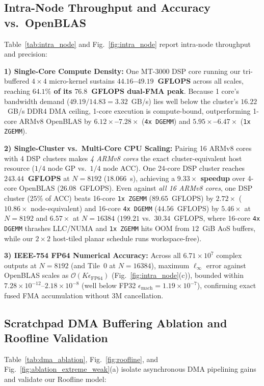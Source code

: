 \documentclass[journal]{IEEEtran}
\begin{document}
\subsection{Intra-Node Throughput and Accuracy vs.\ OpenBLAS}
Table~\ref{tab:intra_node} and Fig.~\ref{fig:intra_node} report intra-node throughput and precision:

\textbf{1) Single-Core Compute Density:} One MT-3000 DSP core running our tri-buffered $4 \times 4$ micro-kernel sustains \textbf{$44.16$--$49.19$~GFLOPS} across all scales, reaching \textbf{$64.1\%$ of its $76.8$~GFLOPS dual-FMA peak}. Because 1 core's bandwidth demand ($49.19 / 14.83 = 3.32$~GB/s) lies well below the cluster's $16.22$~GB/s DDR4 DMA ceiling, 1-core execution is compute-bound, outperforming 1-core ARMv8 OpenBLAS by \textbf{$6.12\times$--$7.28\times$} (\texttt{4x DGEMM}) and \textbf{$5.95\times$--$6.47\times$} (\texttt{1x ZGEMM}).

\textbf{2) Single-Cluster vs.\ Multi-Core CPU Scaling:} Pairing 16 ARMv8 cores with 4 DSP clusters makes \emph{4 ARMv8 cores} the exact cluster-equivalent host resource ($1/4$ node GP vs.\ $1/4$ node ACC). One 24-core DSP cluster reaches \textbf{$243.44$~GFLOPS} at $N=8192$ ($18.066$~s), achieving a \textbf{$9.33\times$ speedup} over 4-core OpenBLAS ($26.08$~GFLOPS). Even against \emph{all 16 ARMv8 cores}, one DSP cluster ($25\%$ of ACC) beats 16-core \texttt{1x ZGEMM} ($89.65$~GFLOPS) by \textbf{$2.72\times$} ($10.86\times$ node-equivalent) and 16-core \texttt{4x DGEMM} ($44.56$~GFLOPS) by \textbf{$5.46\times$} at $N=8192$ and \textbf{$6.57\times$} at $N=16384$ ($199.21$ vs.\ $30.34$~GFLOPS, where 16-core \texttt{4x DGEMM} thrashes LLC/NUMA and \texttt{1x ZGEMM} hits OOM from $12$~GiB AoS buffers, while our $2 \times 2$ host-tiled planar schedule runs workspace-free).

\textbf{3) IEEE-754 FP64 Numerical Accuracy:} Across all $6.71 \times 10^7$ complex outputs at $N=8192$ (and Tile~0 at $N=16384$), maximum $\ell_\infty$ error against OpenBLAS scales as $\mathcal{O}(K \epsilon_{\mathrm{FP64}})$ (Fig.~\ref{fig:intra_node}(c)), bounded within $7.28 \times 10^{-12}$--$2.18 \times 10^{-8}$ (well below FP32 $\epsilon_{\mathrm{mach}} = 1.19 \times 10^{-7}$), confirming exact fused FMA accumulation without 3M cancellation.

\subsection{Scratchpad DMA Buffering Ablation and Roofline Validation}
Table~\ref{tab:dma_ablation}, Fig.~\ref{fig:roofline}, and Fig.~\ref{fig:ablation_extreme_weak}(a) isolate asynchronous DMA pipelining gains and validate our Roofline model:
\end{document}

